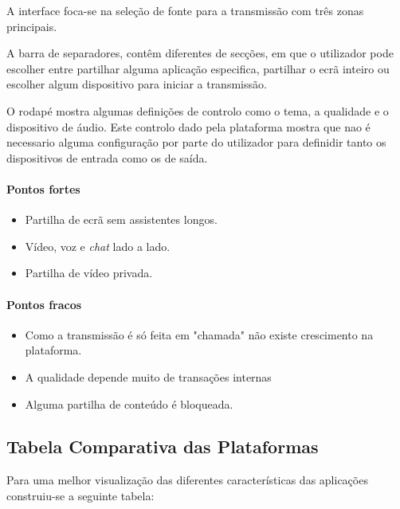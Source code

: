 A interface foca-se na seleção de fonte para a transmissão com três zonas principais.

A barra de separadores, contêm diferentes de secções, em que o utilizador pode escolher entre partilhar alguma aplicação especifica, partilhar o ecrã inteiro ou escolher algum dispositivo para iniciar a transmissão.

O rodapé mostra algumas definições de controlo como o tema, a qualidade e o dispositivo de áudio. Este controlo dado pela plataforma mostra que nao é necessario alguma configuração por parte do utilizador para definidir tanto os dispositivos de entrada como os de saída.

\paragraph{Pontos fortes}
\begin{itemize}
  \item Partilha de ecrã sem assistentes longos.
  \item Vídeo, voz e \textit{chat} lado a lado.
  \item Partilha de vídeo privada.
\end{itemize}

\paragraph{Pontos fracos}
\begin{itemize}
    \item Como a transmissão é só feita em "chamada" não existe crescimento na plataforma.
    \item A qualidade depende muito de transações internas
    \item Alguma partilha de conteúdo é bloqueada. 
\end{itemize}

\subsection{Tabela Comparativa das Plataformas}

Para uma melhor visualização das diferentes características das aplicações construiu-se a seguinte tabela: 

